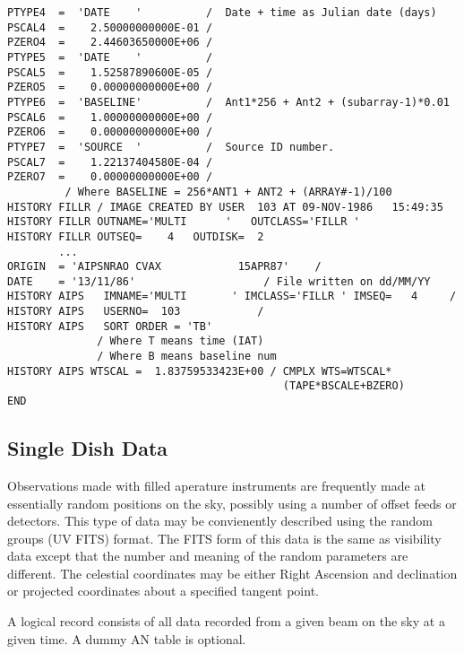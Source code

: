 \begin{verbatim}
PTYPE4  =  'DATE    '          /  Date + time as Julian date (days)
PSCAL4  =    2.50000000000E-01 /
PZERO4  =    2.44603650000E+06 /
PTYPE5  =  'DATE    '          /
PSCAL5  =    1.52587890600E-05 /
PZERO5  =    0.00000000000E+00 /
PTYPE6  =  'BASELINE'          /  Ant1*256 + Ant2 + (subarray-1)*0.01
PSCAL6  =    1.00000000000E+00 /
PZERO6  =    0.00000000000E+00 /
PTYPE7  =  'SOURCE  '          /  Source ID number.
PSCAL7  =    1.22137404580E-04 /
PZERO7  =    0.00000000000E+00 /
         / Where BASELINE = 256*ANT1 + ANT2 + (ARRAY#-1)/100
HISTORY FILLR / IMAGE CREATED BY USER  103 AT 09-NOV-1986   15:49:35
HISTORY FILLR OUTNAME='MULTI      '   OUTCLASS='FILLR '
HISTORY FILLR OUTSEQ=    4   OUTDISK=  2
        ...
ORIGIN  = 'AIPSNRAO CVAX            15APR87'    /
DATE    = '13/11/86'                    / File written on dd/MM/YY
HISTORY AIPS   IMNAME='MULTI       ' IMCLASS='FILLR ' IMSEQ=   4     /
HISTORY AIPS   USERNO=  103            /
HISTORY AIPS   SORT ORDER = 'TB'
              / Where T means time (IAT)
              / Where B means baseline num
HISTORY AIPS WTSCAL =  1.83759533423E+00 / CMPLX WTS=WTSCAL*
                                           (TAPE*BSCALE+BZERO)
END

\end{verbatim}

\subsection{Single Dish Data }
     Observations made with filled aperature instruments are
frequently made at essentially random positions on the sky, possibly
using a number of offset feeds or detectors.  This type
of data may be convienently described using the random groups (UV
FITS) format.  The FITS form of this data is the same as visibility
data except that the number and meaning of the random parameters are
different.  The celestial coordinates may be either Right Ascension
and declination or projected coordinates about a specified tangent
point.

     A logical record consists of all data recorded from a given
beam on the sky at a given time.  A dummy AN table is optional.

